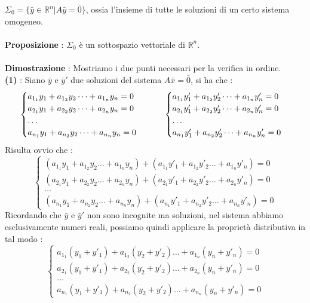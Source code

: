 \documentclass[12pt, letterpaper]{article}
\newcommand{\R}{{\mathbb R}}
\newcommand{\acc}{\\\hphantom{}\\}
\begin{document}
\(\Sigma_0=\{\bar y \in \R^n| A\bar y = \bar0\}\), ossia l'insieme di tutte le soluzioni di un certo sistema 
omogeneo.\acc \textbf{Proposizione} : \(\Sigma_0\) è un sottospazio vettoriale di \(\R^n\).\acc 
\textbf{Dimostrazione }: Mostriamo i due punti necessari per la verifica in ordine.\\  \textbf{(1) }: Siano 
\(\bar y\) e \(\bar y'\) due soluzioni del sistema  \(A\bar x = \bar 0\), si ha che : \begin{equation}
    \begin{cases}
        a_{1_1}y_1+a_{1_2}y_2\dots+a_{1_n}y_n=0\\
        a_{2_1}y_1+a_{2_2}y_2\dots+a_{2_n}y_n=0\\\dots\\ 
        a_{n_1}y_1+a_{n_2}y_2\dots+a_{n_n}y_n=0
    \end{cases}\text{\hphantom{aaaa}}\begin{cases}
        a_{1_1}y'_1+a_{1_2}y'_2\dots+a_{1_n}y'_n=0\\
        a_{2_1}y'_1+a_{2_2}y'_2\dots+a_{2_n}y'_n=0\\\dots\\ 
        a_{n_1}y'_1+a_{n_2}y'_2\dots+a_{n_n}y'_n=0
    \end{cases}
\end{equation}
Risulta ovvio che : \begin{equation}
    \begin{cases}
        (a_{1_1}y_1+a_{1_2}y_2\dots+a_{1_n}y_n)+(a_{1_1}y'_1+a_{1_2}y'_2\dots+a_{1_n}y'_n)=0\\
        (a_{2_1}y_1+a_{2_2}y_2\dots+a_{2_n}y_n)+(a_{2_1}y'_1+a_{2_2}y'_2\dots+a_{2_n}y'_n)=0\\\dots\\ 
        (a_{n_1}y_1+a_{n_2}y_2\dots+a_{n_n}y_n)+(a_{n_1}y'_1+a_{n_2}y'_2\dots+a_{n_n}y'_n)=0
    \end{cases}
\end{equation}
Ricordando che \(\bar y\) e \(\bar y'\) non sono incognite ma soluzioni, nel sistema abbiamo esclusivamente 
numeri reali, possiamo quindi applicare la proprietà distributiva in tal modo : \begin{equation}
    \begin{cases}
        a_{1_1}(y_1+y'_1)+a_{1_2}(y_2+y'_2)\dots+a_{1_n}(y_n+y'_n)=0\\
        a_{2_1}(y_1+y'_1)+a_{2_2}(y_2+y'_2)\dots+a_{2_n}(y_n+y'_n)=0\\\dots\\ 
        a_{n_1}(y_1+y'_1)+a_{n_2}(y_2+y'_2)\dots+a_{n_n}(y_n+y'_n)=0
    \end{cases}
\end{equation}
\end{document}
